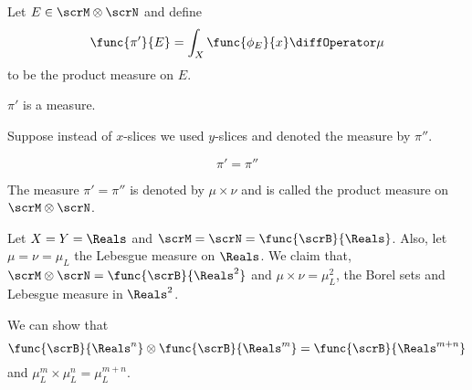 \begin{definition}
    Let \(E \in \scrM \otimes \scrN\) and define 
    \begin{equation*}
        \func{\pi'}{E} = \int_X \func{\phi_E}{x}\diffOperator \mu 
    \end{equation*}
    to be the product measure on \(E\).
\end{definition}

\begin{proposition}
    \(\pi'\) is a measure.
\end{proposition}

Suppose instead of \(x\)-slices we used \(y\)-slices and denoted the measure by \(\pi''\). 
\begin{theorem}
    \begin{equation*}
        \pi' = \pi''
    \end{equation*}
\end{theorem}

\begin{definition}
    The measure \(\pi' = \pi''\) is denoted by \(\mu \times \nu\) and is called the product measure on \(\scrM \otimes \scrN\).
\end{definition}

\begin{example}
    Let \(X = Y = \Reals\) and \(\scrM = \scrN = \func{\scrB}{\Reals}\). Also, let \(\mu = \nu =\mu_L\) the Lebesgue measure on \(\Reals\). We claim that, \(\scrM \otimes \scrN = \func{\scrB}{\Reals^2}\) and \(\mu \times \nu = \mu^2_L\), the Borel sets and Lebesgue measure in \(\Reals^2\).
\end{example}

\begin{example}
    We can show that 
    \begin{equation*}
        \func{\scrB}{\Reals^n} \otimes \func{\scrB}{\Reals^m} = \func{\scrB}{\Reals^{m+n}} 
    \end{equation*} 
    and \(\mu^{m}_L \times \mu^{n}_L = \mu^{m+n}_L\).
\end{example}

